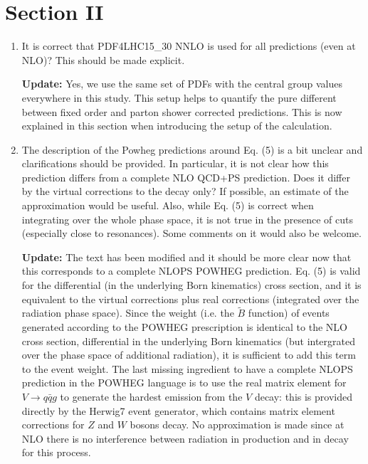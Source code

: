 \documentclass[12pt]{article}
\begin{document}
\section*{Section II}
\begin{enumerate}
\item It is correct that PDF4LHC15\_30 NNLO is used for all predictions (even at NLO)? This should be made explicit.

{\bf Update:} Yes, we use the same set of PDFs with the central group values everywhere in this study. This setup helps to quantify the pure different between fixed order and parton shower corrected predictions. This is now explained in this section when introducing the setup of the calculation. 

\item The description of the Powheg predictions around Eq. (5) is a bit unclear and clarifications should be provided. In particular, it is not clear how this prediction differs from a complete NLO QCD+PS prediction. Does it differ by the virtual corrections to the decay only? If possible, an estimate of the approximation would be useful. Also, while Eq. (5) is correct when integrating over the whole phase space, it is not true in the presence of cuts (especially close to resonances). Some comments on it would also be welcome.

{\bf Update:} The text has been modified and it should be more clear now that this corresponds to a complete NLOPS POWHEG prediction. Eq. (5) is valid for the differential (in the underlying Born kinematics) cross section, and it is equivalent to the virtual corrections plus real corrections (integrated over the radiation phase space). 
Since the weight (i.e. the  $\tilde{B}$ function) of events generated according to the POWHEG prescription is identical to the NLO cross section, differential in the underlying Born kinematics (but intergrated over the phase space of additional radiation),  it is sufficient to add this term to the event weight.
The last missing ingredient to have a complete NLOPS prediction in the POWHEG language is to use the real matrix element for $V\to q \bar{q} g$ to generate the hardest emission from the $V$ decay: this is provided directly by the Herwig7 event generator, which contains matrix element corrections for $Z$ and $W$ bosons decay.
No approximation is made since at NLO there is no interference between radiation in production and in decay for this process. 
 
\end{enumerate}
\end{document}
